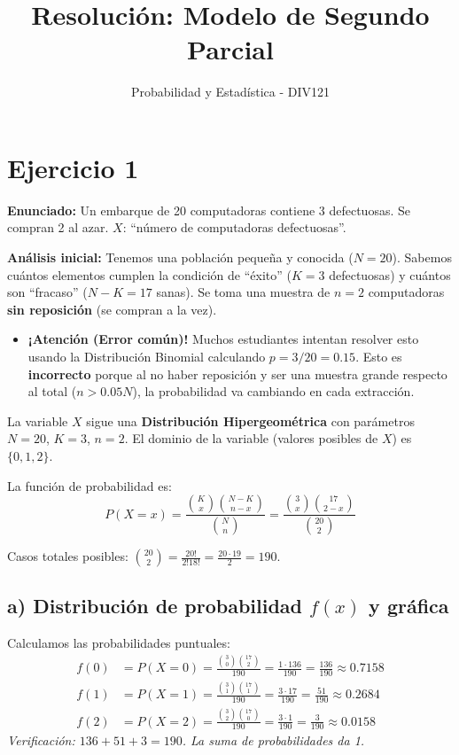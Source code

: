 \documentclass[11pt, a4paper]{article}
\title{\textbf{Resolución: Modelo de Segundo Parcial}}
\author{Probabilidad y Estadística - DIV121}
\date{}
\begin{document}
\maketitle

\section*{Ejercicio 1}
\textbf{Enunciado:} Un embarque de 20 computadoras contiene 3 defectuosas. Se compran 2 al azar. $X$: ``número de computadoras defectuosas''.

\textbf{Análisis inicial:} 
Tenemos una población pequeña y conocida ($N = 20$). Sabemos cuántos elementos cumplen la condición de ``éxito'' ($K = 3$ defectuosas) y cuántos son ``fracaso'' ($N - K = 17$ sanas). Se toma una muestra de $n = 2$ computadoras \textbf{sin reposición} (se compran a la vez). 

\begin{itemize}
    \item \textbf{¡Atención (Error común)!} Muchos estudiantes intentan resolver esto usando la Distribución Binomial calculando $p = 3/20 = 0.15$. Esto es \textbf{incorrecto} porque al no haber reposición y ser una muestra grande respecto al total ($n > 0.05N$), la probabilidad va cambiando en cada extracción.
\end{itemize}

La variable $X$ sigue una \textbf{Distribución Hipergeométrica} con parámetros $N=20$, $K=3$, $n=2$.
El dominio de la variable (valores posibles de $X$) es $\{0, 1, 2\}$.

La función de probabilidad es:
\begin{equation*}
P(X = x) = \frac{\binom{K}{x} \binom{N-K}{n-x}}{\binom{N}{n}} = \frac{\binom{3}{x} \binom{17}{2-x}}{\binom{20}{2}}
\end{equation*}

Casos totales posibles: $\binom{20}{2} = \frac{20!}{2!18!} = \frac{20 \cdot 19}{2} = 190$.

\subsection*{a) Distribución de probabilidad $f(x)$ y gráfica}
Calculamos las probabilidades puntuales:
\begin{align*}
f(0) &= P(X = 0) = \frac{\binom{3}{0} \binom{17}{2}}{190} = \frac{1 \cdot 136}{190} = \frac{136}{190} \approx 0.7158 \\
f(1) &= P(X = 1) = \frac{\binom{3}{1} \binom{17}{1}}{190} = \frac{3 \cdot 17}{190} = \frac{51}{190} \approx 0.2684 \\
f(2) &= P(X = 2) = \frac{\binom{3}{2} \binom{17}{0}}{190} = \frac{3 \cdot 1}{190} = \frac{3}{190} \approx 0.0158
\end{align*}
\textit{Verificación: $136 + 51 + 3 = 190$. La suma de probabilidades da 1.}
\end{document}
